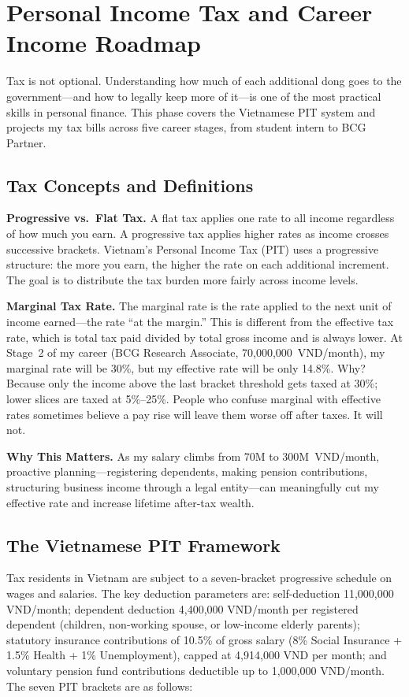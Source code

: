 \chapter{Personal Income Tax and Career Income Roadmap}

Tax is not optional. Understanding how much of each additional dong goes to the government---and how to legally keep more of it---is one of the most practical skills in personal finance. This phase covers the Vietnamese PIT system and projects my tax bills across five career stages, from student intern to BCG Partner.

\section{Tax Concepts and Definitions}

\textbf{Progressive vs.\ Flat Tax.} A flat tax applies one rate to all income regardless of how much you earn. A progressive tax applies higher rates as income crosses successive brackets. Vietnam's Personal Income Tax (PIT) uses a progressive structure: the more you earn, the higher the rate on each additional increment. The goal is to distribute the tax burden more fairly across income levels.

\textbf{Marginal Tax Rate.} The marginal rate is the rate applied to the next unit of income earned---the rate ``at the margin.'' This is different from the effective tax rate, which is total tax paid divided by total gross income and is always lower. At Stage~2 of my career (BCG Research Associate, 70,000,000~VND/month), my marginal rate will be 30\%, but my effective rate will be only 14.8\%. Why? Because only the income above the last bracket threshold gets taxed at 30\%; lower slices are taxed at 5\%--25\%. People who confuse marginal with effective rates sometimes believe a pay rise will leave them worse off after taxes. It will not.

\textbf{Why This Matters.} As my salary climbs from 70M to 300M~VND/month, proactive planning---registering dependents, making pension contributions, structuring business income through a legal entity---can meaningfully cut my effective rate and increase lifetime after-tax wealth.

\section{The Vietnamese PIT Framework}

Tax residents in Vietnam are subject to a seven-bracket progressive schedule on wages and salaries. The key deduction parameters are: self-deduction 11,000,000 VND/month; dependent deduction 4,400,000 VND/month per registered dependent (children, non-working spouse, or low-income elderly parents); statutory insurance contributions of 10.5\% of gross salary (8\% Social Insurance + 1.5\% Health + 1\% Unemployment), capped at 4,914,000 VND per month; and voluntary pension fund contributions deductible up to 1,000,000 VND/month. The seven PIT brackets are as follows:

